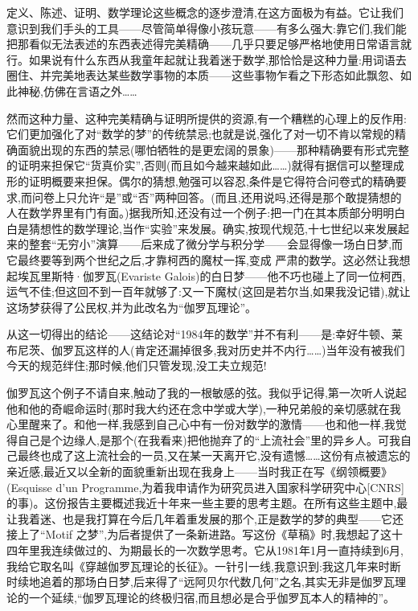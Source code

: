  定义、陈述、证明、数学理论这些概念的逐步澄清,在这方面极为有益。它让我们意识到我们手头的工具——尽管简单得像小孩玩意——有多么强大:靠它们,我们能把那看似无法表述的东西表述得完美精确——几乎只要足够严格地使用日常语言就行。如果说有什么东西从我童年起就让我着迷于数学,那恰恰是这种力量:用词语去圈住、并完美地表达某些数学事物的本质——这些事物乍看之下形态如此飘忽、如此神秘,仿佛在言语之外……

然而这种力量、这种完美精确与证明所提供的资源,有一个糟糕的心理上的反作用:它们更加强化了对“数学的梦”的传统禁忌;也就是说,强化了对一切不肯以常规的精确面貌出现的东西的禁忌(哪怕牺牲的是更宏阔的景象)——那种精确要有形式完整的证明来担保它“货真价实”,否则(而且如今越来越如此……)就得有据信可以整理成形的证明概要来担保。偶尔的猜想,勉强可以容忍,条件是它得符合问卷式的精确要求,而问卷上只允许“是”或“否”两种回答。(而且,还用说吗,还得是那个敢提猜想的人在数学界里有门有面。)据我所知,还没有过一个例子:把一门在其本质部分明明白白是猜想性的数学理论,当作“实验”来发展。确实,按现代规范,十七世纪以来发展起来的整套“无穷小”演算——后来成了微分学与积分学——会显得像一场白日梦,而它最终要等到两个世纪之后,才靠柯西的魔杖一挥,变成
严肃的数学。这必然让我想起埃瓦里斯特·伽罗瓦(Evariste Galois)的白日梦——他不巧也碰上了同一位柯西,运气不佳;但这回不到一百年就够了:又一下魔杖(这回是若尔当,如果我没记错),就让这场梦获得了公民权,并为此改名为“伽罗瓦理论”。

从这一切得出的结论——这结论对“1984年的数学”并不有利——是:幸好牛顿、莱布尼茨、伽罗瓦这样的人(肯定还漏掉很多,我对历史并不内行……)当年没有被我们今天的规范绊住;那时候,他们只管发现,没工夫立规范!

伽罗瓦这个例子不请自来,触动了我的一根敏感的弦。我似乎记得,第一次听人说起他和他的奇崛命运时(那时我大约还在念中学或大学),一种兄弟般的亲切感就在我心里醒来了。和他一样,我感到自己心中有一份对数学的激情——也和他一样,我觉得自己是个边缘人,是那个(在我看来)把他抛弃了的“上流社会”里的异乡人。可我自己最终也成了这上流社会的一员,又在某一天离开它,没有遗憾……这份有点被遗忘的亲近感,最近又以全新的面貌重新出现在我身上——当时我正在写《纲领概要》(Esquisse d'un Programme,为着我申请作为研究员进入国家科学研究中心[CNRS]的事)。这份报告主要概述我近十年来一些主要的思考主题。在所有这些主题中,最让我着迷、也是我打算在今后几年着重发展的那个,正是数学的梦的典型——它还接上了“Motif 之梦”,为后者提供了一条新进路。写这份《草稿》时,我想起了这十四年里我连续做过的、为期最长的一次数学思考。它从1981年1月一直持续到6月,我给它取名叫《穿越伽罗瓦理论的长征》。一针引一线,我意识到:我这几年来时断时续地追着的那场白日梦,后来得了“远阿贝尔代数几何”之名,其实无非是伽罗瓦理论的一个延续,“伽罗瓦理论的终极归宿,而且想必是合乎伽罗瓦本人的精神的”。

